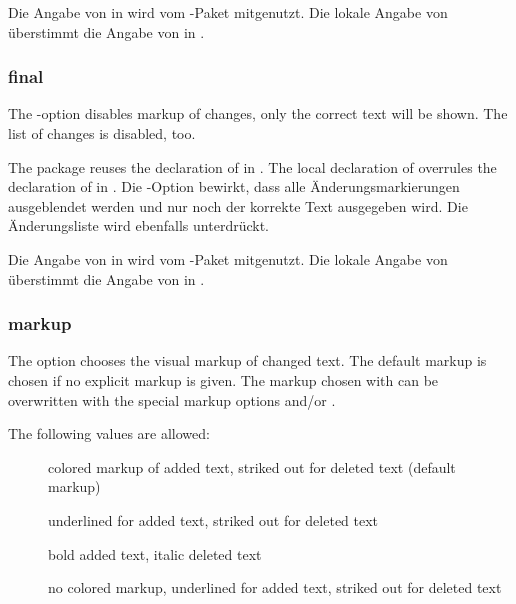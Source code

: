		Die Angabe von  in  wird vom -Paket mitgenutzt.
		Die lokale Angabe von  überstimmt die Angabe von  in .
	\fi


\subsubsection{final}
\ifENGLISH
	The -option disables markup of changes, only the correct text will be shown.
	The list of changes is disabled, too.

	The  package reuses the declaration of  in .
	The local declaration of  overrules the declaration of  in .
\fi
	\ifGERMAN
		Die -Option bewirkt, dass alle Änderungsmarkierungen ausgeblendet werden und nur noch der korrekte Text ausgegeben wird.
		Die Änderungsliste wird ebenfalls unterdrückt.

		Die Angabe von  in  wird vom -Paket mitgenutzt.
		Die lokale Angabe von  überstimmt die Angabe von  in .
	\fi


\subsubsection{markup}
\ifENGLISH
	The  option chooses the visual markup of changed text.
	The default markup is chosen if no explicit markup is given.
	The markup chosen with  can be overwritten with the special markup options  and/or .

	The following values are allowed:
	\begin{description}
		\item [] colored markup of added text, striked out for deleted text (default markup)
		\item [] underlined for added text, striked out for deleted text
		\item [] bold added text, italic deleted text
		\item [] no colored markup, underlined for added text, striked out for deleted text
	\end{description}

